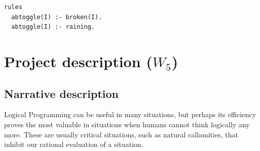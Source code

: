 \documentclass[a4paper,12pt]{report}
\begin{document}
\begin{verbatim}
rules
  abtoggle(I) :- broken(I).
  abtoggle(I) :- raining.
\end{verbatim}



\chapter{Project description ($W_5$)}


\section{Narrative description}

Logical Programming can be useful in many situations, but perhaps its efficiency proves the most valuable in situations when humans cannot think logically any more. These are usually critical situations, such as natural callamities, that inhibit our rational evaluation of a situation. 
\end{document}
